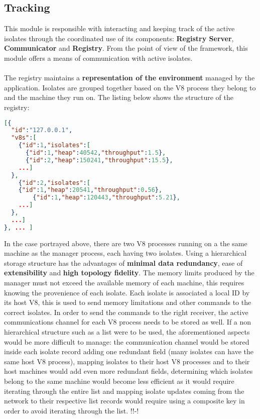 \documentclass{l4proj}
\begin{document}
\subsection{Tracking}
\hspace*{3em} This module is responsible with interacting and keeping track of the active isolates through the coordinated use of its components: \textbf{Registry Server}, \textbf{Communicator} and \textbf{Registry}. From the point of view of the framework, this module offers a means of communication with active isolates.
\\\\ %
\hspace*{3em} The registry maintains a \textbf{representation of the environment} managed by the application. Isolates are grouped together based on the V8 process they belong to and the machine they run on. The listing below shows the structure of the registry:
\begin{lstlisting}[language=json,firstnumber=1]
[{
  "id":"127.0.0.1",
  "v8s":[
    {"id":1,"isolates":[
      {"id":1,"heap":40542,"throughput":1.5},
      {"id":2,"heap":150241,"throughput":15.5},
    ...]
  },
    {"id":2,"isolates":[
    {"id":1,"heap":20541,"throughput":0.56},
        {"id":1,"heap":120443,"throughput":5.21},
    ...]
  },
  ...]
}, ... ]
\end{lstlisting}
In the case portrayed above, there are two V8 processes running on a the same machine as the manager process, each having two isolates. Using a hierarchical storage structure has the advantages of \textbf{minimal data redundancy}, ease of \textbf{extensibility} and \textbf{high topology fidelity}. The memory limits produced by the manager must not exceed the available memory of each machine, this requires knowing the provenience of each isolate. Each isolate is associated a local ID by its host V8, this is used to send memory limitations and other commands to the correct isolates. In order to send the commands to the right receiver, the active communications channel for each V8 process needs to be stored as well. If a non hierarchical structure such as a list were to be used, the aforementioned aspects would be more difficult to manage: the communication channel would be stored inside each isolate record adding one redundant field (many isolates can have the same host V8 process), mapping isolates to their host V8 processes and to their host machines would add even more redundant fields, determining which isolates belong to the same machine would become less efficient as it would require iterating through the entire list and mapping isolate updates coming from the network to their respective list records would require using a composite key in order to avoid iterating through the list. !!-!
\end{document}

